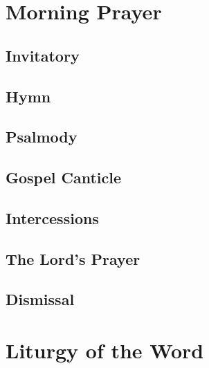 \section[Morning Prayer]{Morning Prayer}
\begin{english}

\subsection*{Invitatory}




\subsection*{Hymn}

\subsection*{Psalmody}









\subsection*{Gospel Canticle}


\subsection*{Intercessions}


\subsection*{The Lord’s Prayer}




\subsection*{Dismissal}

\end{english}

\newpage
\section[Liturgy of the Word]{Liturgy of the Word}
\begin{english}








\end{english}

